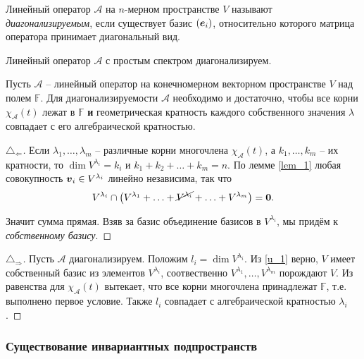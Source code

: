 \begin{to_def} 
    Линейный оператор $\mathcal A $ на $n $-мерном пространстве $V $ называют \textit{диагонализируемым}, если существует базис $(\mbox{\boldmath $e$}_i) $, относительно которого матрица оператора принимает диагональный вид. 
\end{to_def}

\begin{to_thr} 
    Линейный оператор $\mathcal A $ с простым спектром диагонализируем.
\end{to_thr}

\begin{to_thr} 
    Пусть $\mathcal A $ -- линейный оператор на конечномерном векторном пространстве $V $ над полем $\mathbb{F} $. Для диагонализируемости  $\mathcal A $ необходимо и достаточно, чтобы все корни $\chi_{\mathcal A} (t) $ лежат в $\mathbb{F} $  \textbf{и} геометрическая кратность каждого собственного значения $\lambda $ совпадает с его алгебраической кратностью.
\end{to_thr}

\begin{proof}[$\triangle_{\Leftarrow}$]
Если $\lambda_{1}, \ldots, \lambda_m $ -- различные корни многочлена $\chi_{\mathcal A} (t)$, а $k_{1}, \ldots, k_m $ -- их кратности, то $\dim V^{\lambda_i} = k_i$ и $k_{1} + k_{2} + \ldots + k_m = n$. По лемме \ref{lem_1} любая совокупность $\mbox{\boldmath $v$}_i \in V^{\lambda_i}$ линейно независима, так что
\begin{equation}
\label{u_1}
    V^{\lambda_i} \cap \left(V^{\lambda_{1}} + \ldots + \cancel{V^{\lambda_i}} + \ldots + V^{\lambda_m}\right) = \mbox{\boldmath $0$}.
\end{equation}

Значит сумма прямая. Взяв за базис объединение базисов в $V^{\lambda_i}$, мы придём к \textit{собственному базису}. 
\end{proof}

\begin{proof}[$\triangle_{\Rightarrow}$]
    Пусть $\mathcal A$ диагонализируем. Положим $l_i = \dim V^{\lambda_i}$. Из \ref{u_1} верно, $V$ имеет собственный базис из элементов $V^{\lambda_i}$, соотвественно $V^{\lambda_1}, \ldots, V^{\lambda_m}$ порождают $V$. 
    Из равенства для $\chi_{\mathcal A} (t)$ вытекает, что все корни многочлена принадлежат $\mathbb{F}$, т.е. выполнено первое условие. Также $l_i$ совпадает с алгебраической кратностью $\lambda_i$.
\end{proof}

\subsubsection{Существование инвариантных подпространств}

